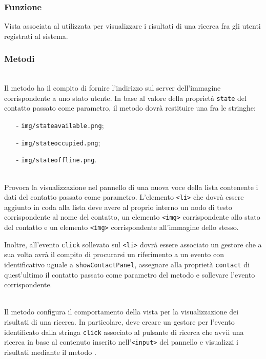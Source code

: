 \subsubsection*{Funzione}
Vista associata al   utilizzata per visualizzare i risultati di una ricerca fra gli utenti registrati al sistema.

\subsubsection*{Metodi}
\begin{description}
  \item{}\\
  Il metodo ha il compito di fornire l'indirizzo sul server dell'immagine corrispondente a uno stato utente. In base al valore della proprietà \verb'state' del contatto passato come parametro, il metodo dovrà restituire una fra le stringhe:
  \begin{itemize}
    \item[-] \verb'img/stateavailable.png';
    \item[-] \verb'img/stateoccupied.png';
    \item[-] \verb'img/stateoffline.png'.
  \end{itemize}
  
  \item{}\\
  Provoca la visualizzazione nel pannello di una nuova voce della lista contenente i dati del contatto passato come parametro. L'elemento \verb'<li>' che dovrà essere aggiunto in coda alla lista deve avere al proprio interno un nodo di testo corrispondente al nome del contatto, un elemento \verb'<img>' corrispondente allo stato del contatto e un elemento \verb'<img>' corrispondente all'immagine dello stesso.
  
  Inoltre, all'evento \verb'click' sollevato sul \verb'<li>' dovrà essere associato un gestore che a sua volta avrà il compito di procurarsi un riferimento a un evento con identificativo uguale a \verb'showContactPanel', assegnare alla proprietà \verb'contact' di quest'ultimo il contatto passato come parametro del metodo e sollevare l'evento corrispondente.
  
  \item{}\\
  Il metodo configura il comportamento della vista per la visualizzazione dei risultati di una ricerca. In particolare, deve creare un gestore per l'evento identificato dalla stringa \verb'click' associato al pulsante di ricerca che avvii una ricerca in base al contenuto inserito nell'\verb'<input>' del pannello e visualizzi i risultati mediante il metodo .
  

\end{description}
